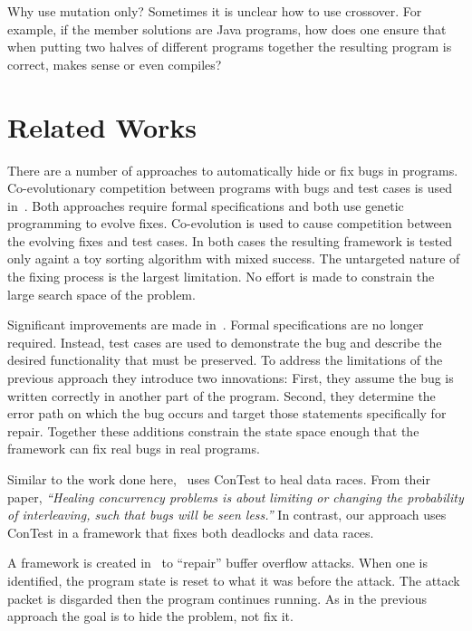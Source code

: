 \documentclass[10pt, conference, compsocconf]{IEEEtran}
\begin{document}
Why use mutation only?  Sometimes it is unclear how to use crossover.  For
example, if the member solutions are Java programs, how does one ensure that
when putting two halves of different programs together the resulting program is
correct, makes sense or even compiles?

\section{Related Works}
\label{sec:related_works}

There are a number of approaches to automatically hide or fix bugs in programs.
Co-evolutionary competition between programs with bugs and test cases is used
in~\cite{AY08, Arc08, WT10}. Both approaches require formal specifications and
both use genetic programming to evolve fixes. Co-evolution is used to cause 
competition between the evolving fixes and test cases. In both cases the 
resulting framework is tested only againt a toy sorting algorithm with mixed 
success. The untargeted nature of the fixing process is the largest limitation. 
No effort is made to constrain the large search space of the problem.

Significant improvements are made in~\cite{FNWG09,
WNLF09, NWLF09, WFGN10, GNFW11}. Formal specifications are no longer required.
Instead, test cases are used to demonstrate the bug and describe the desired
functionality that must be preserved. To address the limitations of the
previous approach they introduce two innovations: First, they assume the bug is
written correctly in another part of the program. Second, they determine the
error path on which the bug occurs and target those statements specifically for
repair. Together these additions constrain the state space enough that the
framework can fix real bugs in real programs.

Similar to the work done here,~\cite{KLT+07, LVK08} uses ConTest to heal data
races. From their paper, \textit{``Healing concurrency problems is about
limiting or changing the probability of interleaving, such that bugs will be
seen less.''} In contrast, our approach uses ConTest in a framework that
fixes both deadlocks and data races.

A framework is created in~\cite{CB05} to ``repair'' buffer overflow attacks.
When one is identified, the program state is reset to what it was before the
attack. The attack packet is disgarded then the program continues running. As
in the previous approach the goal is to hide the problem, not fix it.
\end{document}
